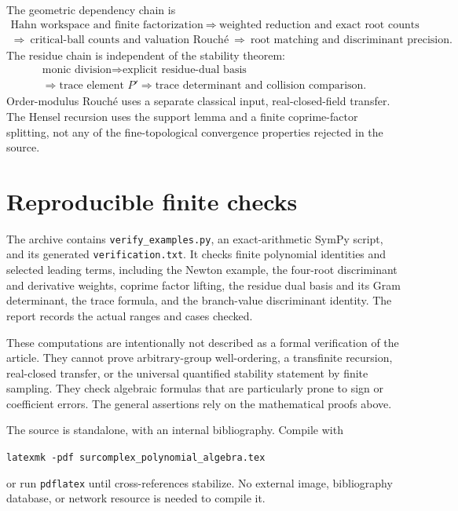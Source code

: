 \documentclass[11pt,letterpaper]{article}
\numberwithin{equation}{section}
\theoremstyle{definition}
\theoremstyle{remark}
\begin{document}
The geometric dependency chain is
\[
 \begin{gathered}
 \text{Hahn workspace and finite factorization}
 \ \Longrightarrow\ \text{weighted reduction and exact root counts}\\
 \Longrightarrow\ \text{critical-ball counts and valuation Rouch\'e}
 \ \Longrightarrow\ \text{root matching and discriminant precision}.
 \end{gathered}
\]
The residue chain is independent of the stability theorem:
\[
 \begin{gathered}
 \text{monic division}
 \Longrightarrow\text{explicit residue-dual basis}\\
 \Longrightarrow\text{trace element }P'
 \Longrightarrow\text{trace determinant and collision comparison}.
 \end{gathered}
\]
Order-modulus Rouch\'e uses a separate classical input, real-closed-field
transfer. The Hensel recursion uses the support lemma and a finite
coprime-factor splitting, not any of the fine-topological convergence
properties rejected in the source.

\section{Reproducible finite checks}\label{app:checks}
The archive contains \texttt{verify\_examples.py}, an exact-arithmetic
SymPy script, and its generated \texttt{verification.txt}. It checks
finite polynomial identities and selected leading terms, including the
Newton example, the four-root discriminant and derivative weights,
coprime factor lifting, the residue dual basis and its Gram determinant,
the trace formula, and the branch-value discriminant identity.
The report records the actual ranges and cases checked.

These computations are intentionally not described as a formal
verification of the article. They cannot prove arbitrary-group
well-ordering, a transfinite recursion, real-closed transfer, or the
universal quantified stability statement by finite sampling. They check
algebraic formulas that are particularly prone to sign or coefficient
errors. The general assertions rely on the mathematical proofs above.

The source is standalone, with an internal bibliography. Compile with
\begin{center}\small
\texttt{latexmk -pdf surcomplex\_polynomial\_algebra.tex}
\end{center}
or run \texttt{pdflatex} until cross-references stabilize. No external image,
bibliography database, or network resource is needed to compile it.
\end{document}
